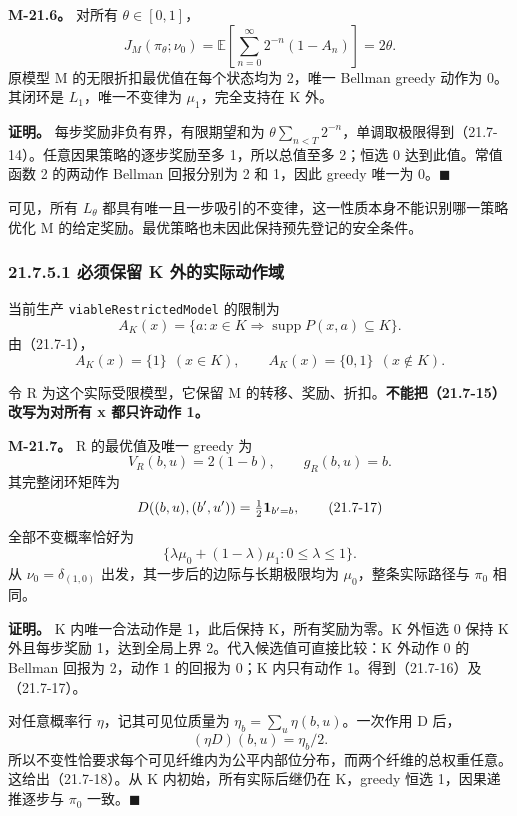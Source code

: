 \documentclass[
  11pt,
  oneside]{book}
\begin{document}
\hypertarget{m-21-6}{}\label{m-21-6}

\textbf{M-21.6。} 对所有 \(\theta\in[0,1]\)， \[J_M(\pi_\theta;\nu_0)
=\mathbb E\!\left[\sum_{n=0}^\infty2^{-n}(1-A_n)\right]
=2\theta.                                          \tag{21.7-14}\] 原模型 M 的无限折扣最优值在每个状态均为 2，唯一 Bellman greedy 动作为 0。其闭环是 \(L_1\)，唯一不变律为 \(\mu_1\)，完全支持在 K 外。

\textbf{证明。} 每步奖励非负有界，有限期望和为 \(\theta\sum_{n<T}2^{-n}\)，单调取极限得到（21.7-14）。任意因果策略的逐步奖励至多 1，所以总值至多 2；恒选 0 达到此值。常值函数 2 的两动作 Bellman 回报分别为 2 和 1，因此 greedy 唯一为 0。\(\blacksquare\)

可见，所有 \(L_\theta\) 都具有唯一且一步吸引的不变律，这一性质本身不能识别哪一策略优化 M 的给定奖励。最优策略也未因此保持预先登记的安全条件。

\subsubsection{21.7.5.1 必须保留 K 外的实际动作域}\label{ux5fc5ux987bux4fddux7559-k-ux5916ux7684ux5b9eux9645ux52a8ux4f5cux57df}

当前生产 \nolinkurl{viableRestrictedModel} 的限制为 \[A_K(x)=\{a:x\in K\Rightarrow \operatorname{supp}P(x,a)\subseteq K\}.\] 由（21.7-1）， \[A_K(x)=\{1\}\ \ (x\in K),\qquad A_K(x)=\{0,1\}\ \ (x\notin K). \tag{21.7-15}\]

令 R 为这个实际受限模型，它保留 M 的转移、奖励、折扣。\textbf{不能把（21.7-15）改写为对所有 x 都只许动作 1。}

\hypertarget{m-21-7}{}\label{m-21-7}

\textbf{M-21.7。} R 的最优值及唯一 greedy 为 \[V_R(b,u)=2(1-b),\qquad g_R(b,u)=b.                   \tag{21.7-16}\] 其完整闭环矩阵为 \[D((b,u),(b',u'))=\tfrac12{\bf1}_{b'=b},              \tag{21.7-17}\] 全部不变概率恰好为 \[\{\lambda\mu_0+(1-\lambda)\mu_1:0\le\lambda\le1\}.   \tag{21.7-18}\] 从 \(\nu_0=\delta_{(1,0)}\) 出发，其一步后的边际与长期极限均为 \(\mu_0\)，整条实际路径与 \(\pi_0\) 相同。

\textbf{证明。} K 内唯一合法动作是 1，此后保持 K，所有奖励为零。K 外恒选 0 保持 K 外且每步奖励 1，达到全局上界 2。代入候选值可直接比较：K 外动作 0 的 Bellman 回报为 2，动作 1 的回报为 0；K 内只有动作 1。得到（21.7-16）及（21.7-17）。

对任意概率行 \(\eta\)，记其可见位质量为 \(\eta_b=\sum_u\eta(b,u)\)。一次作用 D 后， \[(\eta D)(b,u)=\eta_b/2.\] 所以不变性恰要求每个可见纤维内为公平内部位分布，而两个纤维的总权重任意。这给出（21.7-18）。从 K 内初始，所有实际后继仍在 K，greedy 恒选 1，因果递推逐步与 \(\pi_0\) 一致。\(\blacksquare\)
\end{document}
